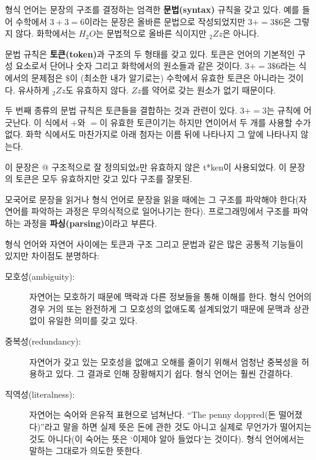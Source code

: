 \documentclass[10pt]{book}
\begin{document}
형식 언어는 문장의 구조를 결정하는 엄격한 {\bf 문법(syntax)} 규칙을 갖고 있다. 
예를 들어 수학에서 $3 + 3 = 6$이라는 문장은 올바른 문법으로 작성되었지만 $3 + = 3 \$ 6$은 그렇지 않다. 화학에서는 $H_2O$는 문법적으로 올바른 식이지만 $_2Zz$은 아니다. 

문법 규칙은 {\bf 토큰(token)}과 구조의 두 형태를 갖고 있다.  토큰은
언어의 기본적인 구성 요소로서 단어나 숫자 그리고 화학에서의 원소들과
같은 것이다.  $3 += 3 \$ 6$라는 식에서의 문제점은 \( \$ \)이 (최소한
내가 알기로는) 수학에서 유효한 토큰은 아니라는 것이다.  유사하게
$_2Zz$도 유효하지 않다. $Zz$를 약어로 갖는 원소가 없기 때문이다.

두 번째 종류의 문법 규칙은 토큰들을 결합하는 것과 관련이 있다. $3 +=
3$는 규칙에 어긋난다. 이 식에서 $+$와 $=$이 유효한 토큰이기는 하지만
연이어서 두 개를 사용할 수가 없다.  화학 식에서도 마찬가지로 아래 첨자는
이름 뒤에 나타나지 그 앞에 나타나지 않는다.

이 문장은 @ 구조적으로 잘 정의되었z만 유효하지 않은 t*ken이
사용되었다. 이 문장의 토큰은 모두 유효하지만 갖고 있다 구조를 잘못된.

모국어로 문장을 읽거나 형식 언어로 문장을 읽을 때에는 그 구조를
파악해야 한다(자연어를 파악하는 과정은 무의식적으로 일어나기는 한다).
프로그래밍에서 구조를 파악하는 과정을 {\bf 파싱(parsing)}이라고
부른다.

형식 언어와 자연어 사이에는 토큰과 구조 그리고 문법과 같은 많은 공통적 기능들이 있지만 차이점도 분명하다:

\begin{description}

\item[모호성(ambiguity):] 자연어는 모호하기 때문에 맥락과 다른 정보들을
  통해 이해를 한다. 형식 언어의 경우 거의 또는 완전하게 그 모호성의
  없애도록 설계되었기 때문에 문맥과 상관없이 유일한 의미를 갖고 있다.

\item[중복성(redundancy):] 자연어가 갖고 있는 모호성을 없애고 오해를
  줄이기 위해서 엄청난 중복성을 허용하고 있다. 그 결과로 인해
  장황해지기 쉽다. 형식 언어는 훨씬 간결하다.

\item[직역성(literalness):] 자연어는 숙어와 은유적 표현으로
  넘쳐난다. ``The penny doppred(돈 떨어졌다)''라고 말을 하면 실제 뜻은
  돈에 관한 것도 아니고 실제로 무언가가 떨어지는 것도 아니다(이 숙어는
  뜻은 `이제야 알아 들었다'는 것이다).  형식 언어에서는 말하는 그대로가
  의도한 뜻한다.

\end{description}
\end{document}
